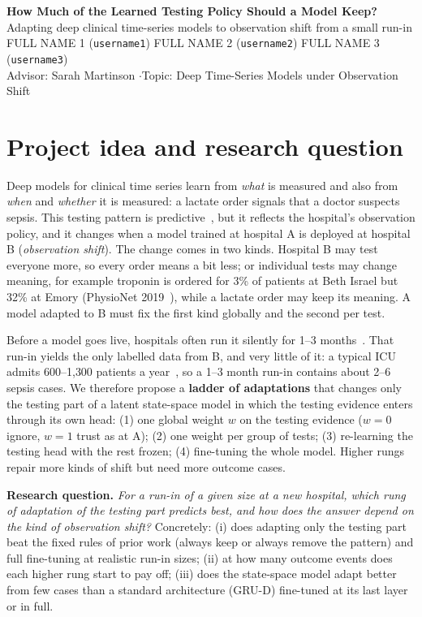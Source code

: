 \documentclass[11pt,a4paper]{article}
\begin{document}
\begin{center}
{\Large\bfseries How Much of the Learned Testing Policy Should a Model Keep?}\\[0.25em]
{\large Adapting deep clinical time-series models to observation shift from a small run-in}\\[0.6em]
FULL NAME 1 (\texttt{username1}) \quad FULL NAME 2 (\texttt{username2}) \quad FULL NAME 3 (\texttt{username3})\\[0.25em]
Advisor: Sarah Martinson \quad$\cdot$\quad Topic: Deep Time-Series Models under Observation Shift
\end{center}

\section{Project idea and research question}

Deep models for clinical time series learn from \emph{what} is measured and also from \emph{when} and \emph{whether} it is measured: a lactate order signals that a doctor suspects sepsis. This testing pattern is predictive~\cite{sisk2021}, but it reflects the hospital's observation policy, and it changes when a model trained at hospital A is deployed at hospital B (\emph{observation shift}). The change comes in two kinds. Hospital B may test everyone more, so every order means a bit less; or individual tests may change meaning, for example troponin is ordered for 3\% of patients at Beth Israel but 32\% at Emory (PhysioNet 2019~\cite{reyna2020}), while a lactate order may keep its meaning. A model adapted to B must fix the first kind globally and the second per test.

Before a model goes live, hospitals often run it silently for 1--3 months~\cite{sendak2020}. That run-in yields the only labelled data from B, and very little of it: a typical ICU admits 600--1{,}300 patients a year~\cite{checkley2014}, so a 1--3 month run-in contains about 2--6 sepsis cases. We therefore propose a \textbf{ladder of adaptations} that changes only the testing part of a latent state-space model in which the testing evidence enters through its own head: (1) one global weight $w$ on the testing evidence ($w{=}0$ ignore, $w{=}1$ trust as at A); (2) one weight per group of tests; (3) re-learning the testing head with the rest frozen; (4) fine-tuning the whole model. Higher rungs repair more kinds of shift but need more outcome cases.

\textbf{Research question.} \emph{For a run-in of a given size at a new hospital, which rung of adaptation of the testing part predicts best, and how does the answer depend on the kind of observation shift?} Concretely: (i) does adapting only the testing part beat the fixed rules of prior work (always keep or always remove the pattern) and full fine-tuning at realistic run-in sizes; (ii) at how many outcome events does each higher rung start to pay off; (iii) does the state-space model adapt better from few cases than a standard architecture (GRU-D) fine-tuned at its last layer or in full.
\end{document}

